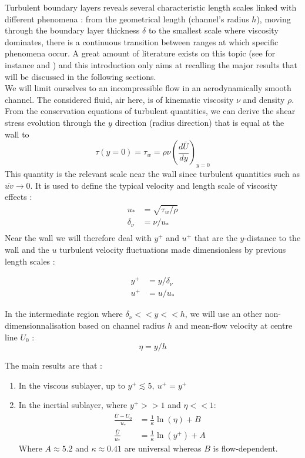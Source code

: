 \documentclass[12pt]{article}
\begin{document}
Turbulent boundary layers reveals several characteristic length scales linked with different phenomena : from the geometrical length (channel's radius $h$), moving through the boundary layer thickness $\delta$ to the smallest scale where viscosity dominates, there is a continuous transition between ranges at which specific phenomena occur. A great amount of literature exists on this topic (see for instance \cite{tennekesFirstCourseTurbulence1972} and \cite{popeTurbulentFlows2000a}) and this introduction only aims at recalling the major results that will be discussed in the following sections.\\

We will limit ourselves to an incompressible flow in an aerodynamically smooth channel. The considered fluid, air here, is of kinematic viscosity $\nu$ and density $\rho$. From the conservation equations of turbulent quantities, we can derive the shear stress evolution through the $y$ direction (radius direction) that is equal at the wall to
\begin{equation}
    \tau (y=0) = \tau_w = \rho \nu \left( \frac{d\bar{U}}{dy} \right)_{y=0}
\end{equation}
This quantity is the relevant scale near the wall since turbulent quantities such as $\overline{uv} \rightarrow 0$. It is used to define the typical velocity and length scale of viscosity effects :
\begin{align}
    u_* &= \sqrt{\tau_w/\rho} \\
    \delta_\nu &= \nu/u_* \\
\end{align}
Near the wall we will therefore deal with $y^+$ and $u^+$ that are the $y$-distance to the wall and the $u$ turbulent velocity fluctuations made dimensionless by previous length scales : 

\begin{align}
    y^+ &= y/\delta_\nu \\
    u^+ &= u/u_*
\end{align}

In the intermediate region where $ \delta_\nu << y << h$, we will use an other non-dimensionnalisation based on channel radius $h$ and mean-flow velocity at centre line $U_0$ :
\begin{equation}
    \eta = y/h
\end{equation}

The main results are that :
\begin{enumerate}
\item In the viscous sublayer, up to $y^+ \lesssim 5, ~ u^+ = y^+$
\item In the inertial sublayer, where $y^+ >> 1$ and $\eta << 1$:
\begin{align}
    \frac{\bar{U}-U_0}{u_*} &= \frac{1}{\kappa}\ln(\eta) + B \\
    \frac{\bar{U}}{u_*} &= \frac{1}{\kappa} \ln (y^+) + A
\end{align}
Where $A \approx 5.2$ and $\kappa \approx 0.41$ are universal whereas $B$ is flow-dependent.
\end{enumerate}
\end{document}
